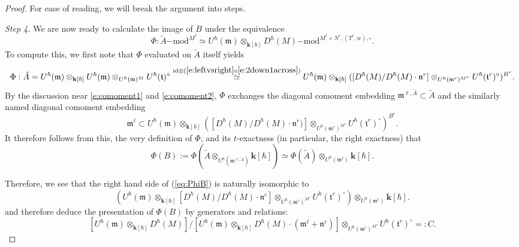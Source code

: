 \documentclass{amsart}
\theoremstyle{definition}
\newcommand{\fm}{\mathfrak{m}}
\newcommand{\lmod}{\on{-mod}}
\newcommand{\ft}{\mathfrak{t}}
\newcommand{\on}{\mathrm}
\newcommand{\bk}{\mathbf{k}}
\numberwithin{equation}{section}
\begin{document}
{\begin{proof} { For ease of reading, we will break the argument into steps. }
{{{\em Step 4.} We are now ready to calculate the image of $B$ under the equivalence 
$$\Phi: \tilde{A}\lmod^{M^\ell} \simeq U^\hbar(\fm)  \otimes_{\bk[\hbar]} D^\hbar(M)\lmod^{M^\ell \times N^r, (T^r, w), \circ}.$$
To compute this, we first note that $\Phi$ evaluated on $\tilde{A}$ itself yields
$$\Phi: \tilde{A} = U^\hbar(\fm) \otimes_{\bk[\hbar]} U^\hbar(\fm) \otimes_{U^\hbar(\fm)^M} U^\hbar(\ft)^\circ \overset{\on{id} \otimes  (\eqref{e:leftvsright} \circ  \eqref{e:2down1across})}\simeq U^\hbar(\fm) \otimes_{\bk[\hbar]}  ([D^\hbar(M)/D^\hbar(M) \cdot \mathfrak{n}^r]  \otimes_{{U^\hbar(\fm^r)^{M^r}}} U^\hbar(\ft^r)^\circ)^{B^r}.$$
By the discussion near \eqref{e:comoment1} and \eqref{e:comoment2}, $\Phi$ exchanges the diagonal comoment embedding $\fm^{\ell, \tilde{A}} \subset \tilde{A}$ and the similarly named diagonal comoment embedding $$\fm^\ell \subset U^\hbar(\fm) \otimes_{\bk[\hbar]}  ([D^\hbar(M)/D^\hbar(M) \cdot \mathfrak{n}^r)]  \otimes_{{U^\hbar(\fm^r)^{M^r}}} U^\hbar(\ft^r)^\circ)^{B^r}.$$ 
It therefore follows from this, the very definition of $\Phi$, and its $t$-exactness (in particular, the right exactness) that
\begin{equation}\label{eq:PhiB}\Phi(B) := \Phi( \tilde{A} \otimes_{U^\hbar(\fm^{\ell, \tilde{A}})} \bk[\hbar])\simeq \Phi(\tilde{A})   \otimes_{U^\hbar(\fm^\ell)} \bk[\hbar].\end{equation}

Therefore, we see that the right hand side of (\ref{eq:PhiB}) is naturally isomorphic to
$$(U^\hbar(\fm)  \otimes_{\bk[\hbar]} [D^\hbar(M)/ D^\hbar(M) \cdot \mathfrak{n}^r]  \otimes_{U^\hbar(\fm^r)^{M^r}} U^\hbar(\ft^r)^\circ)  \otimes_{U^\hbar(\fm^\ell)} \bk[\hbar].$$
and therefore deduce the presentation of $\Phi(B)$ by generators and relations: $$[U^\hbar(\fm)  \otimes_{\bk[\hbar]} D^\hbar(M)]/ [U^\hbar(\fm)  \otimes_{\bk[\hbar]} D^\hbar(M) \cdot (\fm^\ell + \mathfrak{n}^r)]  \otimes_{U^\hbar(\fm^r)^{M^r}} U^\hbar(\ft^r)^\circ =: C.$$

}}
\end{proof}}
\end{document}
